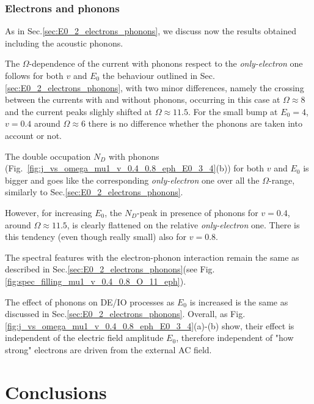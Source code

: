 \documentclass[aps,prb,groupedaddress,showpacs,twocolumn,superscriptaddress,10pt]{revtex4-2}
\begin{document}
\subsubsection{Electrons and phonons}
\label{sec:higher_E0_electrons_phonons} 

As in Sec.\ref{sec:E0_2_electrons_phonons}, we discuss now the results obtained including the acoustic phonons.

The $\Omega$-dependence of the current with phonons respect to the \emph{only-electron} one follows for both $v$ and $E_0$ the behaviour outlined in Sec.\ref{sec:E0_2_electrons_phonons}, with two minor differences, namely the crossing between the currents with and without phonons, occurring in this case at $\Omega\approx8$ and the current peaks slighly shifted at $\Omega\approx11.5$. For the small bump at $E_0=4$, $v=0.4$ around $\Omega\approx6$ there is no difference whether the phonons are taken into account or not.

 
The double occupation $N_D$ with phonons (Fig.~\ref{fig:j_vs_omega_mu1_v_0.4_0.8_eph_E0_3_4}(b)) for both $v$ and $E_0$ is bigger and goes like the corresponding \emph{only-electron} one over all the $\Omega$-range, similarly to Sec.\ref{sec:E0_2_electrons_phonons}.

However, for increasing $E_0$, the $N_D$-peak in presence of phonons for $v=0.4$, around $\Omega\approx11.5$, is clearly flattened on the relative \emph{only-electron} one. There is this tendency (even though really small) also for $v=0.8$. 

The spectral features with the electron-phonon interaction remain the same as described in Sec.\ref{sec:E0_2_electrons_phonons}(see Fig.\ref{fig:spec_filling_mu1_v_0.4_0.8_O_11_eph}). 
  
 
The effect of phonons on DE/IO processes as $E_0$ is increased is the same as discussed in Sec.\ref{sec:E0_2_electrons_phonons}. Overall, as Fig.\ref{fig:j_vs_omega_mu1_v_0.4_0.8_eph_E0_3_4}(a)-(b) show, their effect is independent of the electric field amplitude $E_0$, therefore independent of "how strong" electrons are driven from the external AC field. 

\section{Conclusions}
\label{sec:conclusions} 
  
\end{document}
